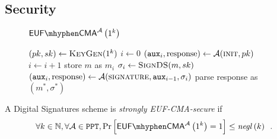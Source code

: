   \subsection{Security}
    \begin{figure}[H]
      \begin{gamebox}{$\mathsf{EUF \mhyphen CMA}^{\adversary}\left(1^k\right)$}
        \begin{algorithmic}[1]
          \State $(pk, sk) \gets \textsc{KeyGen}(1^k)$
          \State $i \gets 0$
          \State $(\mathtt{aux}_i, \mathrm{response}) \gets
          \mathcal{A}(\textsc{init}, pk)$
            \State $i \gets i + 1$
            \State store $m$ as $m_i$
            \State $\sigma_i \gets \textsc{SignDS}(m, sk)$
            \State $(\mathtt{aux}_i, \mathrm{response}) \gets
            \mathcal{A}(\textsc{signature}, \mathtt{aux}_{i-1}, \sigma_i)$
          \EndWhile
          \State parse response as $(m^*, \sigma^*)$
            \State {}
          \Else
            \State {}
          \EndIf
        \end{algorithmic}
      \end{gamebox}
      \caption{}
      \label{game:ds}
    \end{figure}
    \begin{definition}
      \label{def:ds:secure}
      A Digital Signatures scheme is \emph{strongly \textsf{EUF-CMA}-secure} if
      \begin{equation*}
        \forall k \in \mathbb{N}, \forall \adversary \in \mathtt{PPT},
        \Pr\left[\mathsf{EUF \mhyphen CMA}^{\adversary}\left(1^k\right) =
        1\right] \leq \mathit{negl}\left(k\right) \enspace.
      \end{equation*}
    \end{definition}

